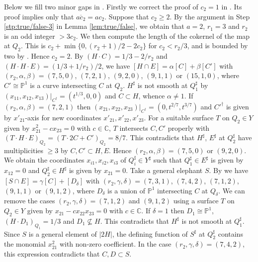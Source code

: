 \documentclass[a4paper,11pt]{amsart}
\theoremstyle{definition}
\theoremstyle{remark}
\numberwithin{equation}{section}
\newcommand{\bC}{{\mathbb C}}
\newcommand{\bP}{{\mathbb P}}
\newcommand{\system}[1]{\left|{#1}\right|}
\begin{document}
\medskip
Below we fill two minor gaps in \cite{Ka03}.
Firstly we correct the proof of $c_2=1$ in \cite[Lemma 3.11(i)]{Ka03}.
Its proof implies only that $\overline{ac_2}=ac_2$.
Suppose that $c_2\ge2$.
By the argument in Step \ref{stp:true/false-3} in Lemma \ref{lem:true/false},
we obtain that $a=2$, $r_1=3$ and $r_2$ is an odd integer $>3c_2$.
We then compute
the length of the cokernel of the map \cite[(2.7)]{Ka03} at $Q_2$.
This is $c_2+\min\{0,(r_2+1)/2-2c_2\}$ for $c_2<r_2/3$,
and is bounded by two by \cite[Lemma 2.10]{Ka03}.
Hence $c_2=2$.
By $(H \cdot C)=1/3-2/r_2$ and $(H \cdot H \cdot E)=(1/3+1/r_2)/2$,
we have $[H \cap E]=\alpha[C]+\beta[C']$ with
$(r_2,\alpha,\beta)=(7,5,0)$, $(7,2,1)$, $(9,2,0)$, $(9,1,1)$ or $(15,1,0)$,
where $C'\cong\bP^1$ is a curve intersecting $C$ at $Q_2$.
$H^\sharp$ is not smooth at $Q_1^\sharp$
by $(x_{11},x_{12},x_{13})|_{C^\dag}=(t^{1/3},0,0)$ and $C \subset H$,
whence $\alpha \neq 1$.
If $(r_2,\alpha,\beta)=(7,2,1)$
then $(x_{21},x_{22},x_{23})|_{C^\dag}=(0,t^{2/7},t^{3/7})$
and ${C'}^\dag$ is given by ${x'}_{21}$-axis
for new coordinates ${x'}_{21},{x'}_{22},{x'}_{23}$.
For a suitable surface $T$ on $Q_2 \in Y$ given by
$x_{21}^2-cx_{23}=0$ with $c \in \bC$,
$T$ intersects $C,C'$ properly with
$(T \cdot H \cdot E)_{Q_2}=(T \cdot 2C+C')_{Q_2}=8/7$.
This contradicts that $H^\sharp$, $E^\sharp$ at $Q_2^\sharp$
have multiplicities $\ge 3$  by $C,C' \subset H,E$.
Hence $(r_2,\alpha,\beta)=(7,5,0)$ or $(9,2,0)$.
We obtain the coordinates $x_{i1},x_{i2},x_{i3}$ of $Q_i^\sharp \in Y^\sharp$
such that $Q_1^\sharp \in E^\sharp$ is given by $x_{12}=0$ and 
$Q_2^\sharp \in H^\sharp$ is given by $x_{21}=0$.
Take a general elephant $S$.
By \cite[Lemma 3.4]{Ka03} we have
$[S \cap E]=\gamma[C]+[D_\delta]$ with
$(r_2,\gamma,\delta)=(7,3,1)$, $(7,4,2)$, $(7,1,2)$, $(9,1,1)$ or $(9,1,2)$,
where $D_\delta$ is a union of $\bP^1$ intersecting $C$ at $Q_\delta$.
We can remove the cases $(r_2,\gamma,\delta)=(7,1,2)$ and $(9,1,2)$
using a surface $T$ on $Q_2\in Y$ given by
$x_{21}-cx_{22}x_{23}=0$ with $c\in\bC$.
If $\delta=1$ then $D_1 \cong \bP^1$,
$(H \cdot D_1)_{Q_1}=1/3$ and $D_1 \not\subseteq H$.
This contradicts that $H^\sharp$ is not smooth at $Q_1^\sharp$.
Since $S$ is a general element of $\system{2H}$,
the defining function of $S^\sharp$ at $Q_2^\sharp$
contains the monomial $x_{21}^2$ with non-zero coefficient.
In the case $(r_2,\gamma,\delta)=(7,4,2)$,
this expression contradicts that $C,D \subset S$.
\end{document}
